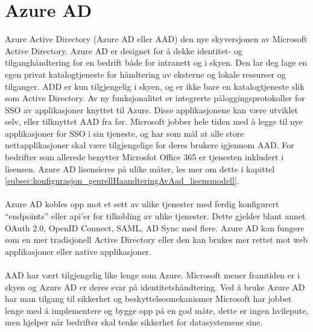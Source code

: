 \section{Azure AD}
\label{sec:teoridel_azureAd}
Azure Active Directory (Azure AD eller AAD) den nye skyversjonen av Microsoft Active Directory. Azure AD er designet for å dekke identitet- og tilganghåndtering for en bedrift både for intranett og i skyen. Den lar deg lage en egen privat katalogtjeneste for håndtering av eksterne og lokale ressurser og tilganger. ADD er kun tilgjengelig i skyen, og er ikke bare en katalogtjeneste slik som Active Directory. Av ny funksjonalitet er integrerte påloggingsprotokoller for SSO av applikasjoner knyttet til Azure. Disse applikasjonene kan være utviklet selv, eller tilknyttet AAD fra før. Microsoft jobber hele tiden med å legge til nye applikasjoner for SSO i sin tjeneste, og har som mål at alle store nettapplikasjoner skal være tilgjengelige for deres brukere igjennom AAD. For bedrifter som allerede benytter Microsfot Office 365 er tjenesten inkludert i lisensen. Azure AD lisensieres på ulike måter, les mer om dette i kapittel \ref{subsec:konfigurasjon_genrellHaandteringAvAad_lisensmodell}.
\\
\\
Azure AD kobles opp mot et sett av ulike tjenester med ferdig konfigurert “endpoints” eller api’er for tilkobling av ulike tjenester. Dette gjelder blant annet OAuth 2.0, OpenID Connect, SAML, AD Sync med flere. Azure AD kan fungere som en mer tradisjonell Active Directory eller den kan brukes mer rettet mot web applikasjoner eller native applikasjoner. 
\\
\\
AAD har vært tilgjengelig like lenge som Azure. Microsoft mener framtiden er i skyen og Azure AD er deres svar på identitetshåndtering. Ved å bruke Azure AD har man tilgang til sikkerhet og beskyttelsesmekanismer Microsoft har jobbet lenge med å implementere og bygge opp på en god måte, dette er ingen hvilepute, men hjelper når bedrifter skal tenke sikkerhet for datasystemene sine.

